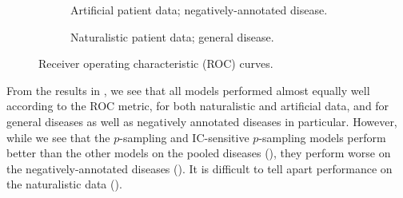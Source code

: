 \begin{figure}[!h]
\begin{subfigure}{0.4\textwidth}
    \caption{Artificial patient data; negatively-annotated disease.}
    \label{fig:rocartneg}
    \end{subfigure}

    \begin{center}
    \begin{subfigure}{0.4\textwidth}
    \caption{Naturalistic patient data; general disease.}
    \label{fig:rocnatgen}
    \end{subfigure}
    \end{center}
    \caption{Receiver operating characteristic (ROC) curves.}
    \label{fig:roc}
\end{figure}

From the results in , we see that all models performed almost equally well
according to the ROC metric, for both naturalistic and artificial data, and for general
diseases as well as negatively annotated diseases in particular.
%
However, while we see that the $p$-sampling and IC-sensitive $p$-sampling models
perform better than the other models on the pooled diseases (),
they perform worse on the negatively-annotated diseases ().
%
It is difficult to tell apart performance on the naturalistic data ().


